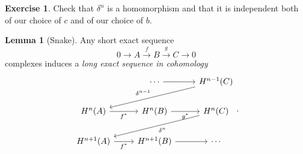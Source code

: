 \documentclass[10pt,letterpaper,cm]{nupset}
\theoremstyle{definition}
\theoremstyle{theorem}
\newtheorem{lemma}[definition]{Lemma}
\newtheorem{exercise}[definition]{Exercise}
\theoremstyle{remark}
\newcommand{\1}{\mathbf{1}}
\newcommand{\0}{\vec 0}
\begin{document}
\begin{exercise}
Check that $\delta^n$ is a homomorphism and that it is independent both of our choice of $c$ and of our choice of $b$. 
\end{exercise}

\begin{lemma}[Snake]\label{snake}
Any short exact sequence $$0 \to A \overset{f}{\longrightarrow} B \overset{g}{\longrightarrow} C \to 0$$  complexes induces a \textit{long exact sequence in cohomology}
\[
\begin{tikzcd}
                                  & \cdots \arrow[r]              & H^{n-1}(C) \arrow[lld, "\delta^{n-1}"'] \\
H^n(A) \arrow[r, "f^{\ast}"']     & H^n(B) \arrow[r, "g^{\ast}"'] & H^n(C) \arrow[lld, "\delta^n"]          \\
H^{n+1}(A) \arrow[r, "f^{\ast}"'] & H^{n+1}(B) \arrow[r]          & \cdots                                 
\end{tikzcd}
.\]
\end{lemma}
\end{document}
